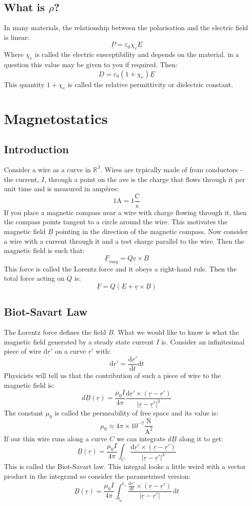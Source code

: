 \documentclass[12pt]{article}
\newcommand{\df}[2]{\frac{\text{d}#1}{\text{d}#2}}
\begin{document}
\subsection{What is \(\rho\)?}
In many materials, the relationship between the polarisation and the electric field is linear:
\[\underline{P}=\varepsilon_0\chi_{e}\underline{E}\]
Where \(\chi_e\) is called the electric susceptibility and depends on the material. in a question this value may be given to you if required. Then:
\[\underline{D}=\varepsilon_0(1+\chi_e)\underline{E}\]
This quantity \(1+\chi_e\) is called the relative permittivity or dielectric constant.
\clearpage
\section{Magnetostatics}
\subsection{Introduction}
Consider a wire as a curve in \(\mathbb{R^3}\). Wires are typically made of from conductors - the current, \(I\), through a point on the ave is the charge that flows through it per unit time and is measured in amp\`eres:
\[1\text{A}=1\frac{\text{C}}{\text{s}}\]
If you place a magnetic compass near a wire with charge flowing through it, then the compass points tangent to a circle around the wire. This motivates the magnetic field \(\underline{B}\) pointing in the direction of the magnetic compass. Now consider a wire with a current through it and a test charge parallel to the wire. Then the magnetic field is such that:
\[\underline{F}_{mag}=Q\underline{v}\times \underline{B}\]
This force is called the Lorentz force and it obeys a right-hand rule. Then the total force acting on \(Q\) is:
\[\underline{F}=Q(\underline{E}+\underline{v}\times\underline{B})\]
\subsection{Biot-Savart Law}
The Lorentz force defines the field \(B\). What we would like to know is what the magnetic field generated by a steady state current \(I\) is. Consider an infinitesimal piece of wire \(\text{d}\underline{r}'\) on a curve \(\underline{r}'\) with:
\[\text{d}\underline{r}'=\df{\underline{r}'}{t}\text{d}t\]
Physicists will tell us that the contribution of such a piece of wire to the magnetic field is:
\[d\underline{B}(\underline{r})=\frac{\mu_0 I}{4\pi}\frac{\text{d}\underline{r}'\times(\underline{r}-\underline{r}')}{|\underline{r}-\underline{r}'|^3}\]
The constant \(\mu_0\) is called the permeability of free space and its value is:
\[\mu_0\approx4\pi\times 10^{-7}\frac{\text{N}}{\text{A}^2}\]
If our thin wire runs along a curve \(C\) we can integrate \(d\underline{B}\) along it to get:
\[\underline{B}(\underline{r})=\frac{\mu_0I}{4\pi}\int_C\frac{\text{d}\underline{r}'\times(\underline{r}-\underline{r}')}{|\underline{r}-\underline{r}'|^3}\]
This is called the Biot-Savart law. This integral looks a little weird with a vector product in the integrand so consider the parametrised version:
\[\underline{B}(\underline{r})=\frac{\mu_0 I}{4\pi}\int^{t_1}_{t_0}\frac{\df{\underline{r}'}{t}\times(\underline{r}-\underline{r}')}{|\underline{r}-\underline{r}'|}\,\text{d}t\]
\end{document}
